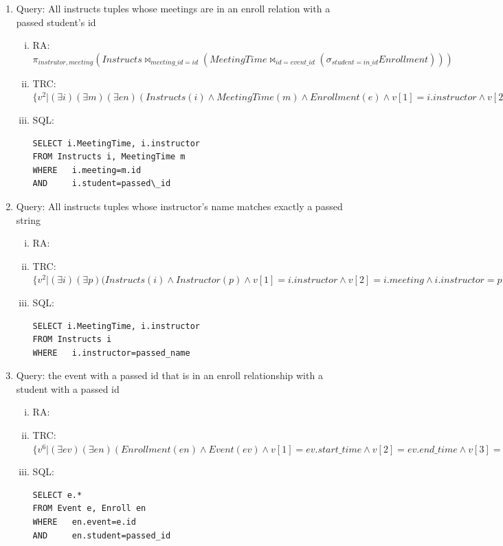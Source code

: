 \documentclass[pdftex,12pt,letter]{article}
\begin{document}
\begin{enumerate}[1.]
\item Query: All instructs tuples whose meetings are in an enroll relation with a
passed student's id
\begin{enumerate}[i.]
\item RA: $ \pi_{instrutor, meeting} (Instructs \bowtie_{meeting\_id=id} (MeetingTime \bowtie_{id=event\_id}(\sigma_{student=in\_id} Enrollment)))$
\item TRC: $\{v^2\vert(\exists i)(\exists m)(\exists en)(Instructs(i) \wedge MeetingTime(m) \wedge Enrollment(e) \wedge v[1]=i.instructor \wedge v[2]=i.meeting \wedge i.meeting=m.id \wedge en.student=input\_id \wedge en.event=m.id)\}$
\item SQL:
\begin{verbatim}
SELECT i.MeetingTime, i.instructor
FROM Instructs i, MeetingTime m
WHERE 	i.meeting=m.id
AND		i.student=passed\_id
\end{verbatim}
\end{enumerate}
\item Query: All instructs tuples whose instructor's name matches exactly a passed string
\begin{enumerate}[i.]
\item RA:
\item TRC: $\{v^2\vert(\exists i)(\exists p)(Instructs(i) \wedge Instructor(p) \wedge v[1]=i.instructor \wedge v[2]=i.meeting \wedge i.instructor=p.name \wedge p.name=input\_name\} $
\item SQL:
\begin{verbatim}
SELECT i.MeetingTime, i.instructor
FROM Instructs i
WHERE 	i.instructor=passed_name
\end{verbatim}
\end{enumerate}
\item Query: the event with a passed id that is in an enroll relationship with a
student with a passed id
\begin{enumerate}[i.]
\item RA:
\item TRC: $\{v^6 \vert (\exists ev)(\exists en)(Enrollment(en) \wedge Event(ev) \wedge v[1]=ev.start\_time \wedge v[2]=ev.end\_time \wedge v[3]=ev.start\_date \wedge v[4].ev.end\_date \wedge v[5]=ev.recur\_type \wedge v[6]=ev.id \wedge en.event = ev.id \wedge en.student=input\_case\_id \wedge ev.id=\wedge input\_event\_id)\}$
\item SQL:
\begin{verbatim}
SELECT e.*
FROM Event e, Enroll en
WHERE 	en.event=e.id
AND		en.student=passed_id
\end{verbatim}
\end{enumerate}
\end{enumerate}
\end{document}
